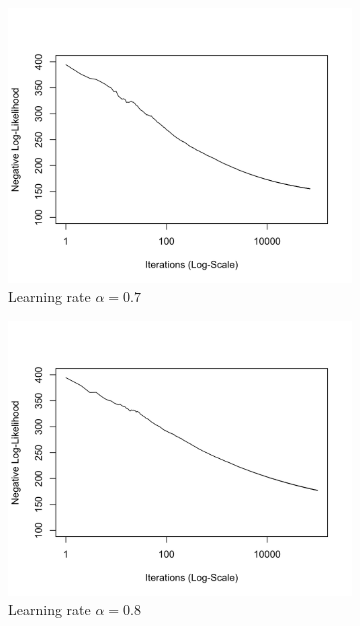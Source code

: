 \documentclass[11 pt]{article}
\begin{document}
\begin{enumerate}[label=(\Alph*)]
\begin{figure}[H]
\begin{center}
\begin{subfigure}[h]{0.45\linewidth}
			\includegraphics[width=\linewidth]{Fig/F3PD07.png}
			\caption{Learning rate $\alpha=0.7$}
		\end{subfigure}
		\begin{subfigure}[h]{0.45\linewidth}
			\includegraphics[width=\linewidth]{Fig/F3PD08.png}
			\caption{Learning rate $\alpha=0.8$}
		\end{subfigure}
		\begin{subfigure}[h]{0.45\linewidth}

\end{subfigure}
\end{center}
\end{figure}
\end{enumerate}
\end{document}
